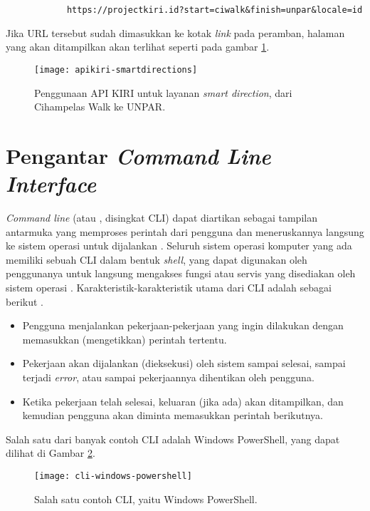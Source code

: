 \begin{verbatim}
            https://projectkiri.id?start=ciwalk&finish=unpar&locale=id
\end{verbatim}
\noindent
Jika URL tersebut sudah dimasukkan ke kotak \textit{link} pada peramban, halaman yang akan ditampilkan akan terlihat seperti pada gambar \ref{fig:kiri-api-smartdirections-usage}.

\begin{figure}[ht]
    \centering
    \texttt{[image: apikiri-smartdirections]}
    \caption[Penggunaan API KIRI untuk layanan \textit{smart direction}]{Penggunaan API KIRI untuk layanan \textit{smart direction}, dari Cihampelas Walk ke UNPAR.}
    \label{fig:kiri-api-smartdirections-usage}
\end{figure}

\section{Pengantar \textit{Command Line Interface}}
\label{sec:commandline}
\textit{Command line} (atau \cli , disingkat CLI) dapat diartikan sebagai tampilan antarmuka yang memproses perintah dari pengguna dan meneruskannya langsung ke sistem operasi untuk dijalankan \cite{shottsjr:2019:linuxcommandline}. Seluruh sistem operasi komputer yang ada memiliki sebuah CLI dalam bentuk \textit{shell}, yang dapat digunakan oleh penggunanya untuk langsung mengakses fungsi atau servis yang disediakan oleh sistem operasi \cite{mueller:2007:windowscommandline}. Karakteristik-karakteristik utama dari CLI adalah sebagai berikut \cite{marsh:2010:fatfreeintrotocommandline} \cite{mueller:2007:windowscommandline}.

\begin{itemize}
	\item Pengguna menjalankan pekerjaan-pekerjaan yang ingin dilakukan dengan memasukkan (\mbox{mengetikkan}) perintah tertentu.
	\item Pekerjaan akan dijalankan (dieksekusi) oleh sistem sampai selesai, sampai terjadi \textit{error}, atau sampai pekerjaannya dihentikan oleh pengguna.
	\item Ketika pekerjaan telah selesai, keluaran (jika ada) akan ditampilkan, dan kemudian pengguna akan diminta memasukkan perintah berikutnya.
\end{itemize}
\noindent
Salah satu dari banyak contoh CLI adalah Windows PowerShell, yang dapat dilihat di Gambar \ref{fig:commandline-example}.

\begin{figure}[h]
    \centering
    \texttt{[image: cli-windows-powershell]}
    \caption[Contoh CLI]{Salah satu contoh CLI, yaitu Windows PowerShell.}
    \label{fig:commandline-example}
\end{figure}


